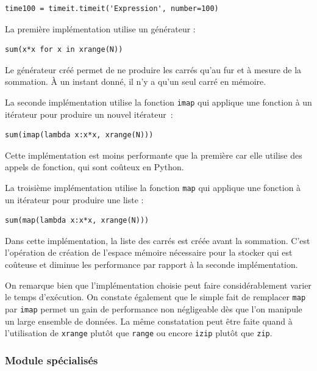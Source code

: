 \documentclass[a4paper]{article}
\begin{document}
\begin{lstlisting}
time100 = timeit.timeit('Expression', number=100)
\end{lstlisting}

La première implémentation utilise un générateur :

\begin{lstlisting}
sum(x*x for x in xrange(N))
\end{lstlisting}

Le générateur créé permet de ne produire les carrés qu'au fur et à
mesure de la sommation. À un instant donné, il n'y a qu'un seul carré
en mémoire.

La seconde implémentation utilise la fonction \texttt{imap} qui
applique une fonction à un itérateur pour produire un nouvel
itérateur~:

\begin{lstlisting}
sum(imap(lambda x:x*x, xrange(N)))
\end{lstlisting}

Cette implémentation est moins performante que la première car elle
utilise des appels de fonction, qui sont coûteux en
Python.

La troisième implémentation utilise la fonction \texttt{map} qui
applique une fonction à un itérateur pour produire une liste :

\begin{lstlisting}
sum(map(lambda x:x*x, xrange(N)))
\end{lstlisting}

Dans cette implémentation, la liste des carrés est créée avant la
sommation. C'est l'opération de création de l'espace mémoire
nécessaire pour la stocker qui est coûteuse et diminue les performance
par rapport à la seconde implémentation.

On remarque bien que l'implémentation choisie peut faire
considérablement varier le temps d'exécution. On constate également
que le simple fait de remplacer \texttt{map} par \texttt{imap} permet
un gain de performance non négligeable dès que l'on manipule un large
ensemble de données. La même constatation peut être faite quand à
l'utilisation de \texttt{xrange} plutôt que \texttt{range} ou encore
\texttt{izip} plutôt que \texttt{zip}.

\subsubsection{Module spécialisés}
\end{document}
